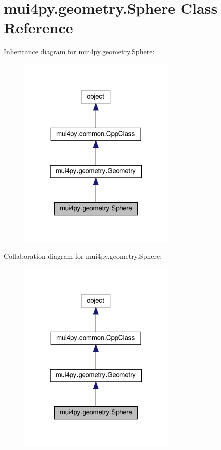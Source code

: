 \hypertarget{classmui4py_1_1geometry_1_1_sphere}{}\section{mui4py.\+geometry.\+Sphere Class Reference}
\label{classmui4py_1_1geometry_1_1_sphere}


Inheritance diagram for mui4py.\+geometry.\+Sphere\+:
\nopagebreak
\begin{figure}[H]
\begin{center}
\leavevmode
\includegraphics[width=217pt]{classmui4py_1_1geometry_1_1_sphere__inherit__graph}
\end{center}
\end{figure}


Collaboration diagram for mui4py.\+geometry.\+Sphere\+:
\nopagebreak
\begin{figure}[H]
\begin{center}
\leavevmode
\includegraphics[width=217pt]{classmui4py_1_1geometry_1_1_sphere__coll__graph}
\end{center}
\end{figure}
